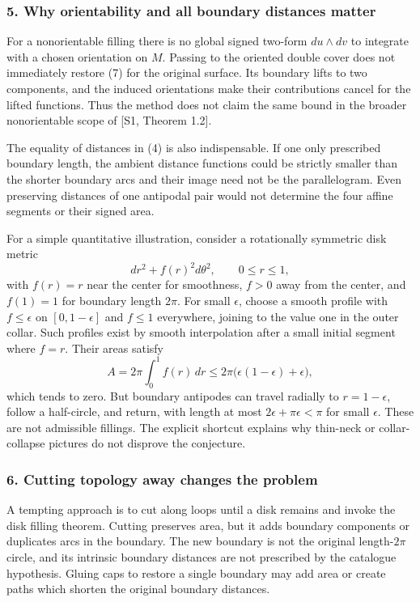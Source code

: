 \documentclass[11pt]{article}
\begin{document}
\subsubsection{5. Why orientability and all boundary distances matter}
For a nonorientable filling there is no global signed two-form $du\wedge dv$ to integrate with a chosen orientation on $M$. Passing to the oriented double cover does not immediately restore (7) for the original surface. Its boundary lifts to two components, and the induced orientations make their contributions cancel for the lifted functions. Thus the method does not claim the same bound in the broader nonorientable scope of [S1, Theorem 1.2].

The equality of distances in (4) is also indispensable. If one only prescribed boundary length, the ambient distance functions could be strictly smaller than the shorter boundary arcs and their image need not be the parallelogram. Even preserving distances of one antipodal pair would not determine the four affine segments or their signed area.

For a simple quantitative illustration, consider a rotationally symmetric disk metric
\[
 dr^2+f(r)^2d\theta^2,\qquad0\le r\le1,
\]
with $f(r)=r$ near the center for smoothness, $f>0$ away from the center, and $f(1)=1$ for boundary length $2\pi$. For small $\epsilon$, choose a smooth profile with $f\le\epsilon$ on $[0,1-\epsilon]$ and $f\le1$ everywhere, joining to the value one in the outer collar. Such profiles exist by smooth interpolation after a small initial segment where $f=r$. Their areas satisfy
\[
 A=2\pi\int_0^1 f(r)\,dr\le 2\pi\bigl(\epsilon(1-\epsilon)+\epsilon\bigr),
\]
which tends to zero. But boundary antipodes can travel radially to $r=1-\epsilon$, follow a half-circle, and return, with length at most
$2\epsilon+\pi\epsilon<\pi$ for small $\epsilon$. These are not admissible fillings. The explicit shortcut explains why thin-neck or collar-collapse pictures do not disprove the conjecture.

\subsubsection{6. Cutting topology away changes the problem}
A tempting approach is to cut along loops until a disk remains and invoke the disk filling theorem. Cutting preserves area, but it adds boundary components or duplicates arcs in the boundary. The new boundary is not the original length-$2\pi$ circle, and its intrinsic boundary distances are not prescribed by the catalogue hypothesis. Gluing caps to restore a single boundary may add area or create paths which shorten the original boundary distances.
\end{document}
